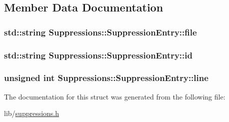 \subsection{Member Data Documentation}
\hypertarget{struct_suppressions_1_1_suppression_entry_afe7f8813ff462fe109943741051a3526}{
\subsubsection[{file}]{\setlength{\rightskip}{0pt plus 5cm}std\-::string Suppressions\-::\-Suppression\-Entry\-::file}}\label{struct_suppressions_1_1_suppression_entry_afe7f8813ff462fe109943741051a3526}
\hypertarget{struct_suppressions_1_1_suppression_entry_a2fff560266ddd69be45d0e9489dce5e9}{
\subsubsection[{id}]{\setlength{\rightskip}{0pt plus 5cm}std\-::string Suppressions\-::\-Suppression\-Entry\-::id}}\label{struct_suppressions_1_1_suppression_entry_a2fff560266ddd69be45d0e9489dce5e9}
\hypertarget{struct_suppressions_1_1_suppression_entry_a87a17c9a09d18cc5f020441aa48e4e9d}{
\subsubsection[{line}]{\setlength{\rightskip}{0pt plus 5cm}unsigned int Suppressions\-::\-Suppression\-Entry\-::line}}\label{struct_suppressions_1_1_suppression_entry_a87a17c9a09d18cc5f020441aa48e4e9d}


The documentation for this struct was generated from the following file\-:\begin{DoxyCompactItemize}
\item 
lib/\hyperlink{suppressions_8h}{suppressions.\-h}\end{DoxyCompactItemize}
